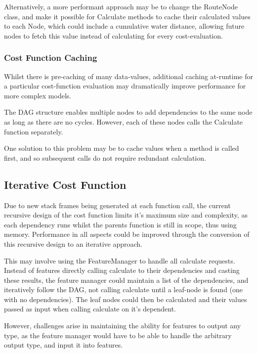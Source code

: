 \documentclass[12pt]{article}
\begin{document}
Alternatively, a more performant approach may be to change the RouteNode class, and make it possible for Calculate methods to cache their calculated values to each Node, which could include a cumulative water distance, allowing future nodes to fetch this value instead of calculating for every cost-evaluation.

\subsubsection{Cost Function Caching}

Whilst there is pre-caching of many data-values, additional caching at-runtime for a particular cost-function evaluation may dramatically improve performance for more complex models.

The DAG structure enables multiple nodes to add dependencies to the same node as long as there are no cycles. However, each of these nodes calls the Calculate function separately.

One solution to this problem may be to cache values when a method is called first, and so subsequent calls do not require redundant calculation.

\subsection{Iterative Cost Function}

Due to new stack frames being generated at each function call, the current recursive design of the cost function limits it's maximum size and complexity, as each dependency runs whilst the parents function is still in scope, thus using memory. Performance in all aspects could be improved through the conversion of this recursive design to an iterative approach.

This may involve using the FeatureManager to handle all calculate requests. Instead of features directly calling calculate to their dependencies and casting these results, the feature manager could maintain a list of the dependencies, and iteratively follow the DAG, not calling calculate until a leaf-node is found (one with no dependencies). The leaf nodes could then be calculated and their values passed as input when calling calculate on it's dependent.

However, challenges arise in maintaining the ability for features to output any type, as the feature manager would have to be able to handle the arbitrary output type, and input it into features.
\end{document}
